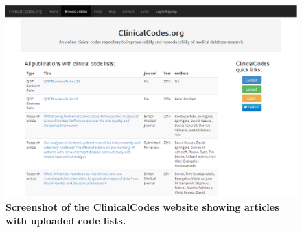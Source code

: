 \documentclass[10pt]{article}
\begin{document}
\begin{figure}[!ht]
\begin{center}
  \includegraphics[width=6in]{figure/clinicalcodes_screenshot.eps}
\end{center}
\caption{
    {\bf Screenshot of the ClinicalCodes website showing articles with uploaded code lists.}
}
\label{figure2_PCD_map}
\end{figure}
\end{document}
